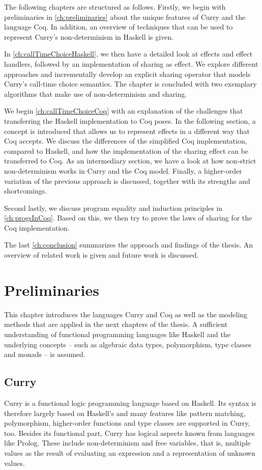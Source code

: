\documentclass[a4paper, 11pt, fleqn, twoside]{scrreprt}
\begin{document}
The following chapters are structured as follows.
Firstly, we begin with preliminaries in \autoref{ch:preliminaries} about the unique features of Curry and the language Coq.
In addition, an overview of techniques that can be used to represent Curry's non-determinism in Haskell is given.

In \autoref{ch:callTimeChoiceHaskell}, we then have a detailed look at effects and effect handlers, followed by an implementation of sharing as effect.
We explore different approaches and incrementally develop an explicit sharing operator that models Curry's call-time choice semantics.
The chapter is concluded with two exemplary algorithms that make use of non-determinism and sharing.

We begin \autoref{ch:callTimeChoiceCoq} with an explanation of the challenges that transferring the Haskell implementation to Coq poses.
In the following section, a concept is introduced that allows us to represent effects in a different way that Coq accepts.
We discuss the differences of the simplified Coq implementation, compared to Haskell, and how the implementation of the sharing effect can be transferred to Coq.
As an intermediary section, we have a look at how non-strict non-determinism works in Curry and the Coq model.
Finally, a higher-order variation of the previous approach is discussed, together with its strengths and shortcomings.

Second lastly, we discuss program equality and induction principles in  \autoref{ch:progsInCoq}.
Based on this, we then try to prove the laws of sharing for the Coq implementation.

The last \autoref{ch:conclusion} summarizes the approach and findings of the thesis.
An overview of related work is given and future work is discussed.

\chapter{Preliminaries}
\label{ch:preliminaries}
This chapter introduces the languages Curry and Coq as well as the modeling methods that are applied in the next chapters of the thesis.
A sufficient understanding of functional programming languages like Haskell and the underlying concepts -- such as algebraic data types, polymorphism, type classes and monads -- is assumed.


\section{Curry}
Curry \citep{hanus2016curry} is a functional logic programming language based on Haskell.
Its syntax is therefore largely based on Haskell's and many features like pattern matching, polymorphism, higher-order functions and type classes are supported in Curry, too.
Besides its functional part, Curry has logical aspects known from languages like Prolog.
These include non-determinism and free variables, that is,  multiple values as the result of evaluating an expression and a representation of unknown values.
\end{document}
